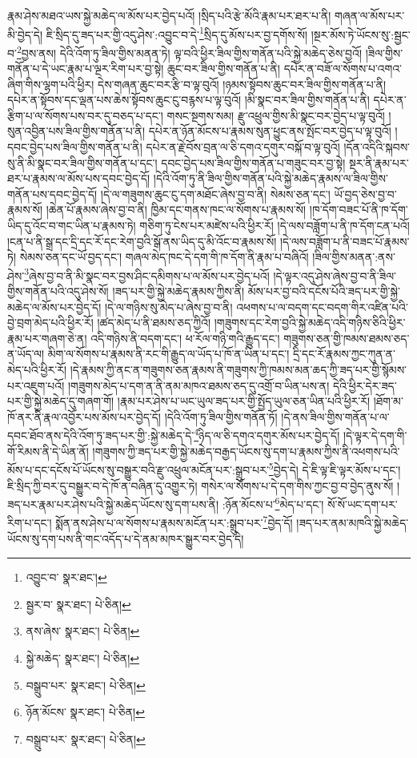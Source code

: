 རྣམ་ཤེས་མཐའ་ཡས་སྐྱེ་མཆེད་ལ་མོས་པར་བྱེད་པའོ། །སྲིད་པའི་རྩེ་མོའི་རྣམ་པར་ཐར་པ་ནི། གཞན་ལ་མོས་པར་མི་བྱེད་དེ། ཇི་སྲིད་དུ་ཟད་པར་གྱི་འདུ་ཤེས་:འབྱུང་བ་དེ་\footnote{འབྱུང་བ་  སྣར་ཐང་། }སྲིད་དུ་མོས་པར་བྱ་དགོས་སོ། །སྔར་མོས་ཏེ་ཡོངས་སུ་:སྦྱང་བ་\footnote{སྦྱར་བ་  སྣར་ཐང་།  པེ་ཅིན། }བྱས་ནས། དེའི་འོག་ཏུ་ཟིལ་གྱིས་མནན་ཏེ། ལྟ་བའི་ཕྱིར་ཟིལ་གྱིས་གནོན་པའི་སྐྱེ་མཆེད་ཅེས་བྱའོ། །ཟིལ་གྱིས་གནོན་པ་དེ་ཡང་རྣམ་པ་ལྔར་རིག་པར་བྱ་སྟེ། ཆུང་བར་ཟིལ་གྱིས་གནོན་པ་ནི། དཔེར་ན་བཟོ་ལ་སོགས་པ་འགའ་ཞིག་གིས་ལྷག་པའི་ཕྱིར། དེས་གཞན་ཆུང་བར་རྩི་བ་ལྟ་བུའོ། །ཉམས་སྟོབས་ཆུང་བར་ཟིལ་གྱིས་གནོན་པ་ནི། དཔེར་ན་སྟོབས་དང་ལྡན་པས་ཆེས་སྟོབས་ཆུང་ངུ་བརྙས་པ་ལྟ་བུའོ། །མི་སྣང་བར་ཟིལ་གྱིས་གནོན་པ་ནི། དཔེར་ན་རྩིག་པ་ལ་སོགས་པས་བར་དུ་བཅད་པ་དང་། གསང་སྔགས་སམ། རྫུ་འཕྲུལ་གྱིས་མི་སྣང་བར་བྱེད་པ་ལྟ་བུའོ། །
སུན་འབྱིན་པས་ཟིལ་གྱིས་གནོན་པ་ནི། དཔེར་ན་ཉོན་མོངས་པ་རྣམས་སུན་ཕྱུང་ནས་སྤོང་བར་བྱེད་པ་ལྟ་བུའོ། །དབང་བྱེད་པས་ཟིལ་གྱིས་གནོན་པ་ནི། དཔེར་ན་རྗེ་བོས་བྲན་ལ་ཅི་དགའ་དགུར་བསྐོ་བ་ལྟ་བུའོ། །དོན་འདིའི་སྐབས་སུ་ནི་མི་སྣང་བར་ཟིལ་གྱིས་གནོན་པ་དང་། དབང་བྱེད་པས་ཟིལ་གྱིས་གནོན་པ་གཟུང་བར་བྱ་སྟེ། སྔར་ནི་རྣམ་པར་ཐར་པ་རྣམས་ལ་མོས་པས་དབང་བྱེད་དོ། །དེའི་འོག་ཏུ་ནི་ཟིལ་གྱིས་གནོན་པའི་སྐྱེ་མཆེད་རྣམས་ལ་ཟིལ་གྱིས་གནོན་པས་དབང་བྱེད་དོ། །དེ་ལ་གཟུགས་ཆུང་ངུ་དག་མཐོང་ཞེས་བྱ་བ་ནི། སེམས་ཅན་དང་། ཡོ་བྱད་ཅེས་བྱ་བ་རྣམས་སོ། །ཆེན་པོ་རྣམས་ཞེས་བྱ་བ་ནི། ཁྱིམ་དང་གནས་ཁང་ལ་སོགས་པ་རྣམས་སོ། །ཁ་དོག་བཟང་པོ་ནི་ཁ་དོག་ཡིད་དུ་འོང་བ་གང་ཡིན་པ་རྣམས་ཏེ། གཅིག་ཏུ་ངེས་པར་མཛེས་པའི་ཕྱིར་རོ། །དེ་ལས་བཟློག་པ་ནི་ཁ་དོག་ངན་པའོ། །ངན་པ་ནི་སྒྲ་དང་དྲི་དང་རོ་དང་རེག་བྱའི་སྒོ་ནས་ཡིད་དུ་མི་འོང་བ་རྣམས་སོ། །དེ་ལས་བཟློག་པ་ནི་བཟང་པོ་རྣམས་ཏེ། སེམས་ཅན་དང་ཡོ་བྱད་དང་། གཞལ་མེད་ཁང་དེ་དག་གི་ཁ་དོག་ནི་རྣམ་པ་བཞིའོ། །ཟིལ་གྱིས་མནན་:ནས་ཤེས་\footnote{ནས་ཞེས་  སྣར་ཐང་།  པེ་ཅིན། }ཞེས་བྱ་བ་ནི་མི་སྣང་བར་བྱས་ཤིང་དམིགས་པ་ལ་མོས་པར་བྱེད་པའོ། །དེ་ལྟར་འདུ་ཤེས་ཞེས་བྱ་བ་ནི་ཟིལ་གྱིས་གནོན་པའི་འདུ་ཤེས་སོ། །ཟད་པར་གྱི་སྐྱེ་མཆེད་རྣམས་ཀྱིས་ནི། མོས་པར་བྱ་བའི་དངོས་པོའི་ཟད་པར་གྱི་སྐྱེ་མཆེད་ལ་མོས་པར་བྱེད་དོ། །དེ་ལ་གཉིས་སུ་མེད་པ་ཞེས་བྱ་བ་ནི། འཕགས་པ་ལ་བདག་དང་བདག་གིར་འཛིན་པའི་བྱེ་བྲག་མེད་པའི་ཕྱིར་རོ། །ཚད་མེད་པ་ནི་ཐམས་ཅད་ཀྱིའོ། །གཟུགས་དང་རེག་བྱའི་སྐྱེ་མཆེད་འདི་གཉིས་ཅིའི་ཕྱིར་རྣམ་པར་གཞག་ཅེ་ན། འདི་གཉིས་ནི་བདག་དང་། ཕ་རོལ་གཉི་གའི་རྒྱུད་དང་། གཟུགས་ཅན་གྱི་ཁམས་ཐམས་ཅད་ན་ཡོད་ལ། མིག་ལ་སོགས་པ་རྣམས་ནི་རང་གི་རྒྱུད་ལ་ཡོད་པ་ཁོ་ན་ཡིན་པ་དང་། དྲི་དང་རོ་རྣམས་ཀྱང་ཀུན་ན་མེད་པའི་ཕྱིར་རོ། །དེ་རྣམས་ཀྱི་ནང་ན་གཟུགས་ཅན་རྣམས་ནི་གཟུགས་ཀྱི་ཁམས་མན་ཆད་ཀྱི་ཟད་པར་གྱི་སྙོམས་པར་འཇུག་པའོ། །གཟུགས་མེད་པ་དག་ན་ནི་ནམ་མཁའ་ཐམས་ཅད་དུ་འགྲོ་བ་ཡིན་པས་ན། དེའི་ཕྱིར་དེར་ཟད་པར་གྱི་སྐྱེ་མཆེད་དུ་གཞག་གོ། །རྣམ་པར་ཤེས་པ་ཡང་ཡུལ་ཟད་པར་གྱི་སྤྱོད་ཡུལ་ཅན་ཡིན་པའི་ཕྱིར་རོ། །ཐོག་མ་ཁོ་ནར་ནི་རྣལ་འབྱོར་པས་མོས་པར་བྱེད་དོ། །དེའི་འོག་ཏུ་ཟིལ་གྱིས་གནོན་ཏོ། །དེ་ནས་ཟིལ་གྱིས་གནོན་པ་ལ་དབང་ཐོབ་ནས་དེའི་འོག་ཏུ་ཟད་པར་གྱི་:སྐྱེ་མཆེད་དེ་\footnote{སྐྱེ་མཆེད་  སྣར་ཐང་།  པེ་ཅིན། }ཉིད་ལ་ཅི་དགའ་དགུར་མོས་པར་བྱེད་དོ། །དེ་ལྟར་དེ་དག་གི་གོ་རིམས་ནི་དེ་ཡིན་ནོ། །གཟུགས་ཀྱི་ཟད་པར་གྱི་སྐྱེ་མཆེད་བརྒྱད་ཡོངས་སུ་དག་པ་རྣམས་ཀྱིས་ནི་འཕགས་པའི་མོས་པ་དང་དངོས་པོ་ཡོངས་སུ་བསྒྱུར་བའི་རྫུ་འཕྲུལ་མངོན་པར་:སྒྲུབ་པར་\footnote{བསྒྲུབ་པར་  སྣར་ཐང་།  པེ་ཅིན། }བྱེད་དེ། དེ་ཇི་ལྟ་ཇི་ལྟར་མོས་པ་དང་། ཇི་སྲིད་ཀྱི་བར་དུ་བསྒྱུར་བ་དེ་ཁོ་ན་བཞིན་དུ་འགྱུར་ཏེ། གསེར་ལ་སོགས་པ་དེ་དག་གིས་ཀྱང་བྱ་བ་བྱེད་ནུས་སོ། །ཟད་པར་རྣམ་པར་ཤེས་པའི་སྐྱེ་མཆེད་ཡོངས་སུ་དག་པས་ནི། :ཉོན་མོངས་པ་\footnote{ཉོན་མོངས་  སྣར་ཐང་།  པེ་ཅིན། }མེད་པ་དང་། སོ་སོ་ཡང་དག་པར་རིག་པ་དང་། སྨོན་ནས་ཤེས་པ་ལ་སོགས་པ་རྣམས་མངོན་པར་:སྒྲུབ་པར་\footnote{བསྒྲུབ་པར་  སྣར་ཐང་།  པེ་ཅིན། }བྱེད་དོ། །ཟད་པར་ནམ་མཁའི་སྐྱེ་མཆེད་ཡོངས་སུ་དག་པས་ནི་གང་འདོད་པ་དེ་ནམ་མཁར་སྒྱུར་བར་བྱེད་དེ། 